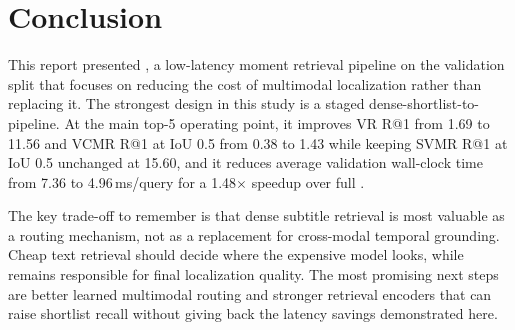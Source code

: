 \section{Conclusion}
\label{sec:conclusion}

This report presented \system, a low-latency moment retrieval pipeline on the \dataset validation split that focuses on reducing the cost of multimodal localization rather than replacing it. The strongest design in this study is a staged dense-shortlist-to-\xml pipeline. At the main top-5 operating point, it improves VR R@1 from 1.69 to 11.56 and VCMR R@1 at IoU 0.5 from 0.38 to 1.43 while keeping SVMR R@1 at IoU 0.5 unchanged at 15.60, and it reduces average validation wall-clock time from 7.36 to 4.96\,ms/query for a 1.48$\times$ speedup over full \xml.

The key trade-off to remember is that dense subtitle retrieval is most valuable as a routing mechanism, not as a replacement for cross-modal temporal grounding. Cheap text retrieval should decide where the expensive model looks, while \xml remains responsible for final localization quality. The most promising next steps are better learned multimodal routing and stronger retrieval encoders that can raise shortlist recall without giving back the latency savings demonstrated here.
